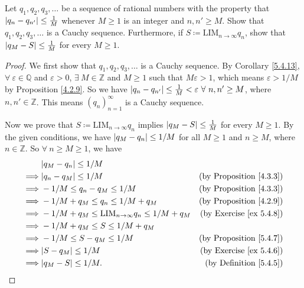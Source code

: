 \begin{exercise}\label{ex 5.5.4}
Let \(q_1, q_2, q_3, \dots\) be a sequence of rational numbers with the property that \(\abs*{q_n - q_{n'}} \leq \frac{1}{M}\) whenever \(M \geq 1\) is an integer and \(n, n' \geq M\).
Show that \(q_1, q_2, q_3, \dots\) is a Cauchy sequence.
Furthermore, if \(S \coloneqq \text{LIM}_{n \to \infty} q_n\), show that \(\abs*{q_M - S} \leq \frac{1}{M}\) for every \(M \geq 1\).
\end{exercise}

\begin{proof}
We first show that \(q_1, q_2, q_3, \dots\) is a Cauchy sequence.
By Corollary \ref{5.4.13}, \(\forall\ \varepsilon \in \mathds{Q}\) and \(\varepsilon > 0\), \(\exists\ M \in \mathds{Z}\) and \(M \geq 1\) such that \(M\varepsilon > 1\), which means \(\varepsilon > 1 / M\) by Proposition \ref{4.2.9}.
So we have \(\abs*{q_n - q_{n'}} \leq \frac{1}{M} < \varepsilon \ \forall\ n, n' \geq M\), where \(n, n' \in \mathds{Z}\).
This means \((q_n)_{n = 1}^{\infty}\) is a Cauchy sequence.

Now we prove that \(S \coloneqq \text{LIM}_{n \to \infty} q_n\) implies \(\abs*{q_M - S} \leq \frac{1}{M}\) for every \(M \geq 1\).
By the given conditions, we have \(\abs*{q_M - q_n} \leq 1 / M\) for all \(M \geq 1\) and \(n \geq M\), where \(n \in \mathds{Z}\).
So \(\forall\ n \geq M \geq 1\), we have
\begin{align*}
& \abs*{q_M - q_n} \leq 1 / M \\
\implies & \abs*{q_n - q_M} \leq 1 / M & \text{(by Proposition \ref{4.3.3})} \\
\implies & -1 / M \leq q_n - q_M \leq 1 / M & \text{(by Proposition \ref{4.3.3})} \\
\implies & -1 / M + q_M \leq q_n \leq 1 / M + q_M & \text{(by Proposition \ref{4.2.9})} \\
\implies & -1 / M + q_M \leq \text{LIM}_{n \to \infty} q_n \leq 1 / M + q_M & \text{(by Exercise \ref{ex 5.4.8})} \\
\implies & -1 / M + q_M \leq S \leq 1 / M + q_M \\
\implies & -1 / M \leq S - q_M \leq 1 / M & \text{(by Proposition \ref{5.4.7})} \\
\implies & \abs*{S - q_M} \leq 1 / M & \text{(by Exercise \ref{ex 5.4.6})} \\
\implies & \abs*{q_M - S} \leq 1 / M. & \text{(by Definition \ref{5.4.5})}
\end{align*}
\end{proof}

